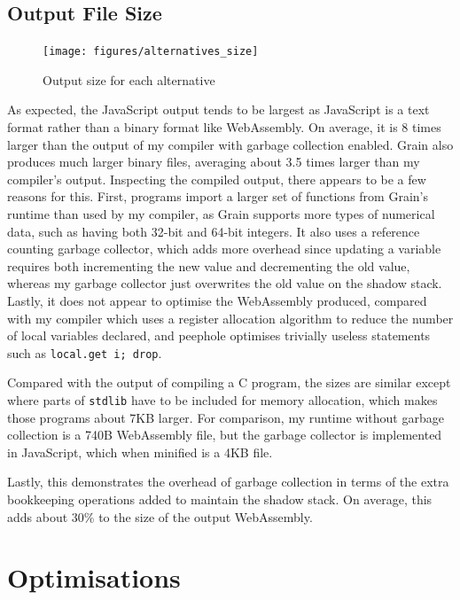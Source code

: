 \subsection{Output File Size}

\begin{figure}[H]
\hspace{-1cm}
\texttt{[image: figures/alternatives\_size]}
\vspace{-0.8cm}
\caption{Output size for each alternative}
 \label{fig:alt_size} 
\end{figure}

As expected, the JavaScript output tends to be largest as JavaScript is a text format rather than a binary format like WebAssembly. On average, it is 8 times larger than the output of my compiler with garbage collection enabled. Grain also produces much larger binary files, averaging about 3.5 times larger than my compiler's output. Inspecting the compiled output, there appears to be a few reasons for this. First, programs import a larger set of functions from Grain's runtime than used by my compiler, as Grain supports more types of numerical data, such as having both 32-bit and 64-bit integers. It also uses a reference counting garbage collector, which adds more overhead since updating a variable requires both incrementing the new value and decrementing the old value, whereas my garbage collector just overwrites the old value on the shadow stack. Lastly, it does not appear to optimise the WebAssembly produced, compared with my compiler which uses a register allocation algorithm to reduce the number of local variables declared, and peephole optimises trivially useless statements such as \verb|local.get i; drop|.

Compared with the output of compiling a C program, the sizes are similar except where parts of \verb|stdlib| have to be included for memory allocation, which makes those programs about 7KB larger. For comparison, my runtime without garbage collection is a 740B WebAssembly file, but the garbage collector is implemented in JavaScript, which when minified is a 4KB file.

Lastly, this demonstrates the overhead of garbage collection in terms of the extra bookkeeping operations added to maintain the shadow stack. On average, this adds about 30\% to the size of the output WebAssembly.

\section{Optimisations}

